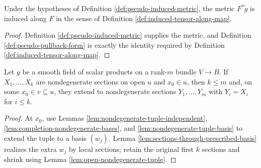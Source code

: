 \begin{lemma}
\label{lem:pseudo-riemannian-submanifold-induced-tensor}
\leanok
{}
Under the hypotheses of Definition \ref{def:pseudo-induced-metric}, the metric $F^*\widetilde g$ is induced along $F$ in the sense of Definition \ref{def:induced-tensor-along-map}.
\end{lemma}
\begin{proof}
\leanok
{}
\sketch Definition \ref{def:pseudo-induced-metric} supplies the metric, and Definition \ref{def:pseudo-pullback-form} is exactly the identity required by Definition \ref{def:induced-tensor-along-map}.
\end{proof}

\begin{lemma}
\label{lem:extend-nondegenerate-family}
\leanok
{}
Let $g$ be a smooth field of scalar products on a rank-$m$ bundle $V\to B$. If $X_1,\ldots,X_k$ are nondegenerate sections on open $u$ and $x_0\in u$, then $k\le m$ and, on some $x_0\in v\subseteq u$, they extend to nondegenerate sections $Y_1,\ldots,Y_m$ with $Y_i=X_i$ for $i\le k$.
\end{lemma}
\begin{proof}
\leanok
{}
\sketch At $x_0$, use Lemmas \ref{lem:nondegenerate-tuple-independent}, \ref{lem:completion-nondegenerate-bases}, and \ref{lem:nondegenerate-tuple-basis} to extend the tuple to a basis $(w_j)$. Lemma \ref{lem:sections-through-prescribed-basis} realizes the extra $w_j$ by local sections; retain the original first $k$ sections and shrink using Lemma \ref{lem:open-nondegenerate-tuple}.
\end{proof}

